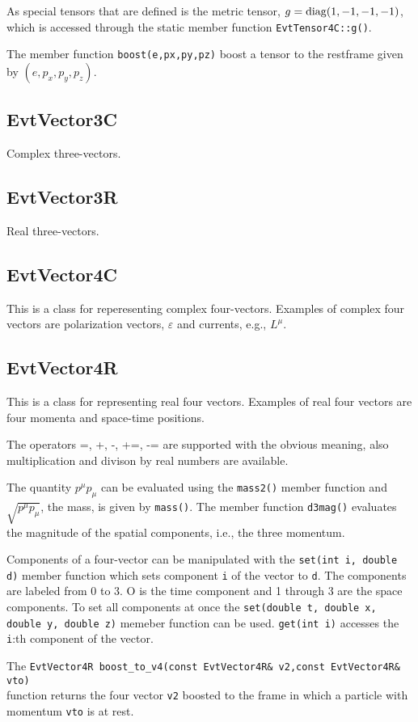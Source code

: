 As special tensors that are defined is the metric tensor, 
$g={\rm diag}(1,-1,-1,-1)$, which is accessed through the static
member function {\tt EvtTensor4C::g()}.

The member function {\tt boost(e,px,py,pz)} boost a tensor to the restframe
given by $(e,p_x,p_y,p_z)$.



\subsection{EvtVector3C}

Complex three-vectors.

\subsection{EvtVector3R}

Real three-vectors.


\subsection{EvtVector4C}

This is a class for reperesenting complex four-vectors. Examples 
of complex four vectors are polarization vectors, $\varepsilon$
and currents, e.g., $L^{\mu}$.

\subsection{EvtVector4R}

This is a class for representing real four vectors. Examples 
of real four vectors are four momenta and space-time positions.

The operators =, +, -, +=, -= are supported with the obvious meaning,
also multiplication and divison by real numbers are available. 

The quantity $p^{\mu}p_{\mu}$ can be evaluated using the {\tt mass2()}
member function and $\sqrt{p^{\mu}p_{\mu}}$, the mass, is given
by {\tt mass()}. The member function {\tt d3mag()} evaluates the
magnitude of the spatial components, i.e., the three momentum.

Components of a four-vector can be manipulated with the 
{\tt set(int i, double d)} member function which sets component
{\tt i} of the vector to {\tt d}. The components are labeled
from 0 to 3. O is the time component and 1 through 3 are
the space components. To set all components at once the 
{\tt set(double t, double x, double y, double z)} memeber function
can be used. {\tt get(int i)} accesses the {\tt i}:th component of
the vector.

The {\tt EvtVector4R boost\_to\_v4(const EvtVector4R\& v2,const EvtVector4R\& vto)}\\ 
function returns the four vector {\tt v2} boosted to the frame in which a particle
with momentum {\tt vto} is at rest.






